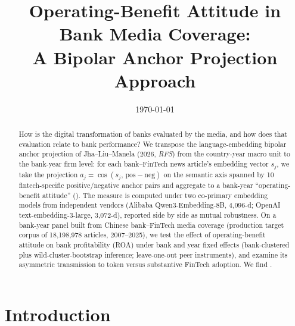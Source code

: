 




\title{Operating-Benefit Attitude in Bank Media Coverage:\\A Bipolar Anchor Projection Approach}
\author{}
\date{\today}


\maketitle

\begin{abstract}
How is the digital transformation of banks evaluated by the media, and
how does that evaluation relate to bank performance? We transpose the
language-embedding bipolar anchor projection of Jha--Liu--Manela (2026,
\emph{RFS}) from the country-year macro unit to the bank-year firm
level: for each bank--FinTech news article's embedding vector $s_j$, we
take the projection $a_j=\cos(s_j,\,\mathrm{pos}-\mathrm{neg})$ on the
semantic axis spanned by 10 fintech-specific positive/negative anchor
pairs and aggregate to a bank-year ``operating-benefit attitude''
(). The measure is computed under two
co-primary embedding models from independent vendors (Alibaba
Qwen3-Embedding-8B, 4{,}096-d; OpenAI text-embedding-3-large,
3{,}072-d), reported side by side as mutual robustness. On a bank-year
panel built from Chinese bank--FinTech media coverage (production
target corpus of 18{,}198{,}978 articles, 2007--2025), we test the
effect of operating-benefit attitude on bank profitability (ROA) under
bank and year fixed effects (bank-clustered plus wild-cluster-bootstrap
inference; leave-one-out peer instruments), and examine its asymmetric
transmission to token versus substantive FinTech adoption. We find
\@.
\end{abstract}

\section{Introduction}\label{sec:intro}

